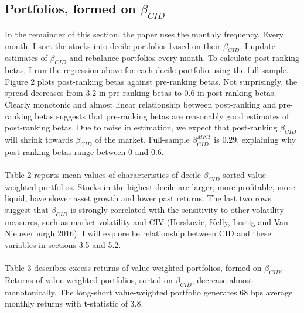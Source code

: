 \documentclass[12pt]{article}
\begin{document}
\subsection{Portfolios, formed on $\beta_{CID}$}

In the remainder of this section, the paper uses the monthly frequency. Every month, I sort the stocks into decile portfolios based on their $\beta_{CID}$. I update estimates of $\beta_{CID}$ and rebalance portfolios every month. To calculate post-ranking betas, I run the  regression above for each decile portfolio using the full sample. Figure 2 plots post-ranking betas against pre-ranking betas. Not surprisingly, the spread decreases from 3.2 in pre-ranking betas to 0.6 in post-ranking betas. Clearly monotonic and almost linear relationship between post-ranking and pre-ranking betas suggests that pre-ranking betas are reasonably good estimates of post-ranking betas. Due to noise in estimation, we expect that post-ranking $\beta_{CID}$ will shrink towards $\beta_{CID}$ of the market. Full-sample $\beta^{MKT}_{CID}$ is 0.29, explaining why post-ranking betas range between 0 and 0.6.
\paragraph{}
Table 2 reports mean values of characteristics of decile $\beta_{CID}$-sorted value-weighted portfolios. Stocks in the highest decile are larger, more profitable, more liquid, have slower asset growth and lower past returns. The last two rows suggest that $\beta_{CID}$ is strongly correlated with the sensitivity to other volatility measures, such as market volatility and CIV (Herskovic, Kelly, Lustig and Van Nieuwerburgh 2016). I will explore he relationship between CID and these variables in sections 3.5 and 5.2.
\paragraph{}
Table 3 describes excess returns of value-weighted portfolios, formed on $\beta_{CID}$. Returns of value-weighted portfolios, sorted on $\beta_{CID}$, decrease almost monotonically. The long-short value-weighted portfolio generates 68 bps average monthly returns with t-statistic of 3.8. 
\end{document}
